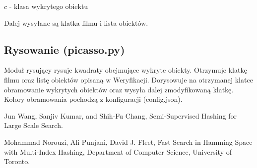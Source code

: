 \documentclass[10pt,a4paper]{article}
\begin{document}
$c$ - klasa wykrytego obiektu

Dalej wysyłane są klatka filmu i lista obiektów.

\subsection{Rysowanie (picasso.py)}

Moduł rysujący rysuje kwadraty obejmujące wykryte obiekty. Otrzymuje klatkę filmu oraz listę obiektów opisaną w Weryfikacji. Dorysowuje na otrzymanej klatce obramowanie wykrytych obiektów oraz wysyła dalej zmodyfikowaną klatkę. Kolory obramowania pochodzą z konfiguracji (config.json).

\begin{thebibliography}{9}

  Jun Wang, Sanjiv Kumar, and Shih-Fu Chang,
  Semi-Supervised Hashing for Large Scale Search.
  
  Mohammad Norouzi, Ali Punjani, David J. Fleet,
  Fast Search in Hamming Space with Multi-Index Hashing,
  Department of Computer Science, University of Toronto.

\end{thebibliography}
\end{document}
